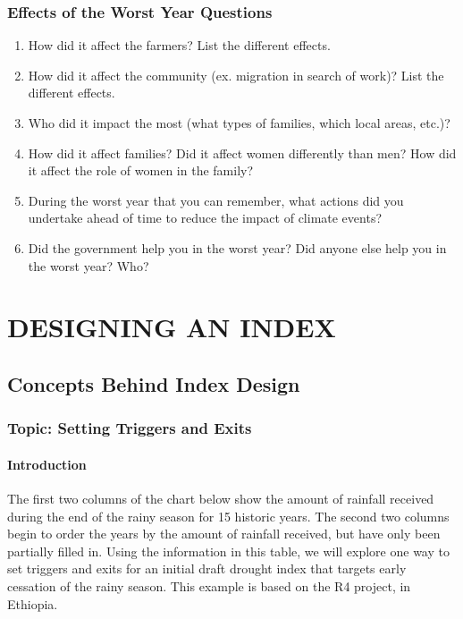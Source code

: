 \documentclass[letterpaper,10pt,english]{sphinxmanual}
\begin{document}
\subsection{Effects of the Worst Year Questions}
\label{games/initialvisitexercise_Ethiopia:effects-of-the-worst-year-questions}\begin{enumerate}
\item {} 
How did it affect the farmers? List the different effects.

\item {} 
How did it affect the community (ex. migration in search of work)? List the different effects.

\item {} 
Who did it impact the most (what types of families, which local areas, etc.)?

\item {} 
How did it affect families? Did it affect women differently than men? How did it affect the role of women in the family?

\item {} 
During the worst year that you can remember, what actions did you undertake ahead of time to reduce the impact of climate events?

\item {} 
Did the government help you in the worst year? Did anyone else help you in the worst year? Who?

\end{enumerate}


\chapter{DESIGNING AN INDEX}
\label{index_updated_educationalMat:designing-an-index}

\section{Concepts Behind Index Design}
\label{whatisindexinsurance/conceptsbehindindexdesign_en_Web:concepts-behind-index-design}\label{whatisindexinsurance/conceptsbehindindexdesign_en_Web::doc}

\subsection{Topic: Setting Triggers and Exits}
\label{whatisindexinsurance/conceptsbehindindexdesign_en_Web:topic-setting-triggers-and-exits}

\subsubsection{Introduction}
\label{whatisindexinsurance/conceptsbehindindexdesign_en_Web:introduction}
The first two columns of the chart below show the amount of rainfall received during the end of the rainy season for 15 historic years. The second two columns begin to order the years by the amount of rainfall received, but have only been partially filled in. Using the information in this table, we will explore one way to set triggers and exits for an initial draft drought index that targets early cessation of the rainy season. This example is based on the R4 project, in Ethiopia.
\end{document}
